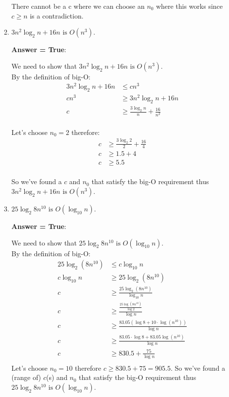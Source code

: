 \documentclass[11pt]{article}
\begin{document}
\begin{enumerate}
\begin{enumerate}
There cannot be a c where we can choose an $n_0$ where this works since $c \ge n$ is a contradiction.

        \item $3 n^{2} \log_{2} n + 16 n \mbox{ is } O(n^{3})$.

\textbf{Answer = True}:

We need to show that $3 n^{2} \log_{2} n + 16 n \mbox{ is } O(n^{3})$.\\
By the definition of big-O:\\
\begin{align*}
    3 n^{2} \log_{2} n + 16 n &\le cn^3 \\
    cn^3 &\ge 3 n^{2} \log_{2} n + 16 n \\
    c &\ge \frac{3\log_2 n}{n} + \frac{16}{n^2} \\
\end{align*}

Let's choose $n_0=2$ therefore:
\begin{align*}
    c &\ge \frac{3\log_2 2}{2} + \frac{16}{4} \\
    c &\ge 1.5 + 4 \\
    c &\ge 5.5 \\
\end{align*}

So we've found a $c$ and $n_0$ that satisfy the big-O requirement thus $3 n^{2} \log_{2} n + 16 n \mbox{ is } O(n^{3})$.

        \item $25 \log_{2} 8n^{10} \mbox{ is }  O(\log_{10} n)$.

\textbf{Answer = True}:

We need to show that $25 \log_{2} 8n^{10} \mbox{ is }  O(\log_{10} n)$.\\
By the definition of big-O:\\
\begin{align*}
    25 \log_{2} (8n^{10}) &\le c\log_{10} n \\
    c\log_{10} n &\ge 25 \log_{2} (8n^{10}) \\
    c &\ge \frac{25 \log_{2} (8n^{10})}{\log_{10} n} \\
    c &\ge \frac{\frac{25 \log (8n^{10})}{\log 2}}{\log n} \\
    c &\ge \frac{83.05 (\log 8 + 10\cdot\log(n^{10}))}{\log n} \\
    c &\ge \frac{83.05\cdot\log 8 + 83.05\log(n^{10})}{\log n}\\
    c &\ge 830.5 + \frac{75}{\log n} \\
\end{align*}
Let's choose $n_0=10$ therefore $c \ge 830.5 + 75 = 905.5$. So we've found a (range of) $c$(s) and $n_0$ that satisfy the big-O requirement thus $25 \log_{2} 8n^{10} \mbox{ is }  O(\log_{10} n)$.


\end{enumerate}
\end{enumerate}
\end{document}
